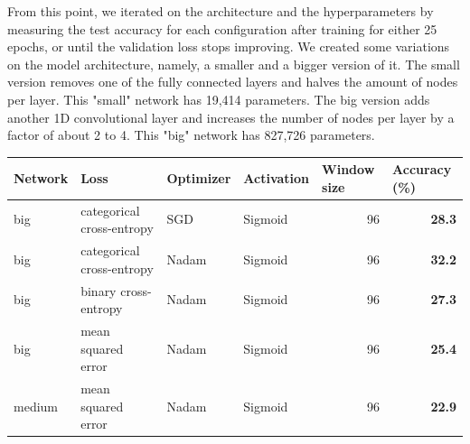 \documentclass[11pt, twocolumn]{article}
\begin{document}
From this point, we iterated on the architecture and the hyperparameters by measuring the test accuracy for each configuration after training for either 25 epochs, or until the validation loss stops improving. We created some variations on the model architecture, namely, a smaller and a bigger version of it. The small version removes one of the fully connected layers and halves the amount of nodes per layer. This "small" network has 19,414 parameters. The big version adds another 1D convolutional layer and increases the number of nodes per layer by a factor of about 2 to 4. This "big" network has 827,726 parameters.

\begin{table}
    \centering
    \begin{tabular}{@{}llllrr@{}}
        \toprule
        \textbf{Network}               & \textbf{Loss}                               & \textbf{Optimizer}            & \textbf{Activation}             & \multicolumn{1}{l}{\textbf{Window size}}                                & \multicolumn{1}{l}{\textbf{Accuracy (\%)}} \\ \midrule
        big                            & categorical cross-entropy                    & SGD                           & Sigmoid                         & \multicolumn{1}{r|}{96}                                                 & \textbf{28.3}                              \\
        big                            & categorical cross-entropy                    & \cellcolor[HTML]{9AFF99}Nadam & Sigmoid                         & \multicolumn{1}{r|}{96}                                                 & \textbf{32.2}                              \\
        big                            & \cellcolor[HTML]{FFCCC9}binary cross-entropy & Nadam                         & Sigmoid                         & \multicolumn{1}{r|}{96}                                                 & \textbf{27.3}                              \\
        big                            & \cellcolor[HTML]{FFCCC9}mean squared error  & Nadam                         & Sigmoid                         & \multicolumn{1}{r|}{96}                                                 & \textbf{25.4}                              \\
        \cellcolor[HTML]{FFCCC9}medium & mean squared error                          & Nadam                         & Sigmoid                         & \multicolumn{1}{r|}{96}                                                 & \textbf{22.9}                              \\

\end{tabular}
\end{table}
\end{document}
